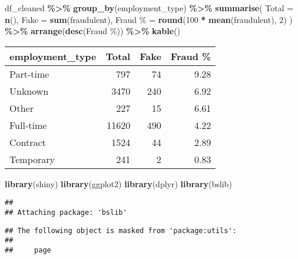 \documentclass[
]{article}
\newenvironment{Shaded}{\begin{snugshade}}{\end{snugshade}}
\newcommand{\AttributeTok}[1]{\textcolor[rgb]{0.13,0.29,0.53}{#1}}
\newcommand{\DecValTok}[1]{\textcolor[rgb]{0.00,0.00,0.81}{#1}}
\newcommand{\FunctionTok}[1]{\textcolor[rgb]{0.13,0.29,0.53}{\textbf{#1}}}
\newcommand{\NormalTok}[1]{#1}
\newcommand{\OtherTok}[1]{\textcolor[rgb]{0.56,0.35,0.01}{#1}}
\newcommand{\SpecialCharTok}[1]{\textcolor[rgb]{0.81,0.36,0.00}{\textbf{#1}}}
\newcommand{\StringTok}[1]{\textcolor[rgb]{0.31,0.60,0.02}{#1}}
\begin{document}
\begin{Shaded}
\begin{Highlighting}[]
\NormalTok{df\_cleaned }\SpecialCharTok{\%\textgreater{}\%}
  \FunctionTok{group\_by}\NormalTok{(employment\_type) }\SpecialCharTok{\%\textgreater{}\%}
  \FunctionTok{summarise}\NormalTok{(}
    \AttributeTok{Total =} \FunctionTok{n}\NormalTok{(),}
    \AttributeTok{Fake =} \FunctionTok{sum}\NormalTok{(fraudulent),}
    \StringTok{\textasciigrave{}}\AttributeTok{Fraud \%}\StringTok{\textasciigrave{}} \OtherTok{=} \FunctionTok{round}\NormalTok{(}\DecValTok{100} \SpecialCharTok{*} \FunctionTok{mean}\NormalTok{(fraudulent), }\DecValTok{2}\NormalTok{)}
\NormalTok{  ) }\SpecialCharTok{\%\textgreater{}\%}
  \FunctionTok{arrange}\NormalTok{(}\FunctionTok{desc}\NormalTok{(}\StringTok{\textasciigrave{}}\AttributeTok{Fraud \%}\StringTok{\textasciigrave{}}\NormalTok{)) }\SpecialCharTok{\%\textgreater{}\%}
  \FunctionTok{kable}\NormalTok{()}
\end{Highlighting}
\end{Shaded}

\begin{longtable}[]{@{}lrrr@{}}
\toprule\noalign{}
employment\_type & Total & Fake & Fraud \% \\
\midrule\noalign{}
\endhead
\bottomrule\noalign{}
\endlastfoot
Part-time & 797 & 74 & 9.28 \\
Unknown & 3470 & 240 & 6.92 \\
Other & 227 & 15 & 6.61 \\
Full-time & 11620 & 490 & 4.22 \\
Contract & 1524 & 44 & 2.89 \\
Temporary & 241 & 2 & 0.83 \\
\end{longtable}

\begin{Shaded}
\begin{Highlighting}[]
\FunctionTok{library}\NormalTok{(shiny)}
\FunctionTok{library}\NormalTok{(ggplot2)}
\FunctionTok{library}\NormalTok{(dplyr)}
\FunctionTok{library}\NormalTok{(bslib)}
\end{Highlighting}
\end{Shaded}

\begin{verbatim}
## 
## Attaching package: 'bslib'
\end{verbatim}

\begin{verbatim}
## The following object is masked from 'package:utils':
## 
##     page
\end{verbatim}
\end{document}
